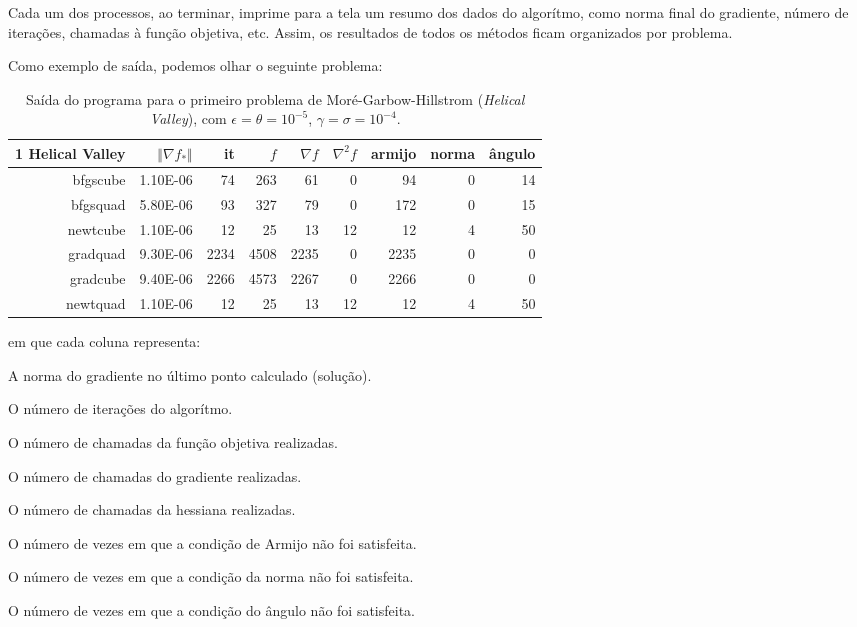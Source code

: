 \documentclass[a4paper,11pt]{article}
\begin{document}
            Cada um dos processos, ao terminar, imprime para a tela um resumo dos dados do algorítmo, como norma final do gradiente, número de iterações, chamadas à função objetiva, etc.
            Assim, os resultados de todos os métodos ficam organizados por problema.

            Como exemplo de saída, podemos olhar o seguinte problema:
            \begin{table}[h]
                \centering
                \begin{tabular}{r|rrrrrrrr}
                    1 Helical Valley  & $\Vert\nabla f_*\Vert$ & it & $f$ & $\nabla f $ & $\nabla^2f$ & armijo & norma & ângulo \\
                    \hline
                    bfgscube & 1.10E-06 & 74 & 263 & 61 & 0 & 94 & 0 & 14 \\
                    bfgsquad & 5.80E-06 & 93 & 327 & 79 & 0 & 172 & 0 & 15 \\
                    newtcube & 1.10E-06 & 12 & 25 & 13 & 12 & 12 & 4 & 50 \\
                    gradquad & 9.30E-06 & 2234 & 4508 & 2235 & 0 & 2235 & 0 & 0 \\
                    gradcube & 9.40E-06 & 2266 & 4573 & 2267 & 0 & 2266 & 0 & 0 \\
                    newtquad & 1.10E-06 & 12 & 25 & 13 & 12 & 12 & 4 & 50
                \end{tabular}
                \caption{Saída do programa para o primeiro problema de Moré-Garbow-Hillstrom (\emph{Helical Valley}), com $\epsilon = \theta = 10^{-5} $, $\gamma = \sigma = 10^{-4}$.}
            \end{table}

            em que cada coluna representa:
            \begin{description}[align=right, leftmargin=4\parindent,labelindent=4\parindent]
                \item [$\Vert\nabla f_*\Vert$] A norma do gradiente no último ponto calculado (solução).
                \item [it] O número de iterações do algorítmo.
                \item [$f$] O número de chamadas da função objetiva realizadas.
                \item [$\nabla f $] O número de chamadas do gradiente realizadas.
                \item [$\nabla^2f$] O número de chamadas da hessiana realizadas.
                \item [armijo] O número de vezes em que a condição de Armijo não foi satisfeita.
                \item [norma] O número de vezes em que a condição da norma não foi satisfeita.
                \item [ângulo] O número de vezes em que a condição do ângulo não foi satisfeita.
            \end{description}
\end{document}

